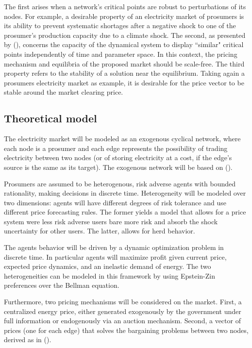 \documentclass[american]{scrartcl}
\begin{document}
The first arises when a network's critical points are robust to perturbations of its nodes. For example, a desirable property of an electricity market of prosumers is its ability to prevent systematic shortages after a negative shock to one of the prosumer's production capacity due to a climate shock. The second, as presented by \citeauthor{Bak1995} (\citeyear{Bak1995}), concerns the capacity of the dynamical system to display ``similar" critical points independently of time and parameter space. In this context, the pricing mechanism and equilibria of the proposed market should be scale-free. The third property refers to the stability of a solution near the equilibrium. Taking again a prosumers electricity market as example, it is desirable for the price vector to be stable around the market clearing price.

\subsection{Theoretical model}

The electricity market will be modeled as an exogenous cyclical network, where each node is a prosumer and each edge represents the possibility of trading electricity between two nodes (or of storing electricity at a cost, if the edge's source is the same as its target). The exogenous network will be based on \citeauthor{Brown2019} (\citeyear{Brown2019}).

Prosumers are assumed to be heterogenous, risk adverse agents with bounded rationality, making decisions in discrete time. Heterogeneity will be modeled over two dimensions: agents will have different degrees of risk tolerance and use different price forecasting rules. The former yields a model that allows for a price system were less risk adverse users bare more risk and absorb the shock uncertainty for other users. The latter, allows for herd behavior. %

The agents behavior will be driven by a dynamic optimization problem in discrete time. In particular agents will maximize profit given current price, expected price dynamics, and an inelastic demand of energy. The two heterogeneities can be modeled in this framework by using Epstein-Zin preferences over the Bellman equation.

Furthermore, two pricing mechanisms will be considered on the market. First, a centralized energy price, either generated exogenously by the government under full information or endogenously via an auction mechanism. Second, a vector of prices (one for each edge) that solves the bargaining problems between two nodes, derived as in \citeauthor{Bedayo2016} (\citeyear{Bedayo2016}).
\end{document}
